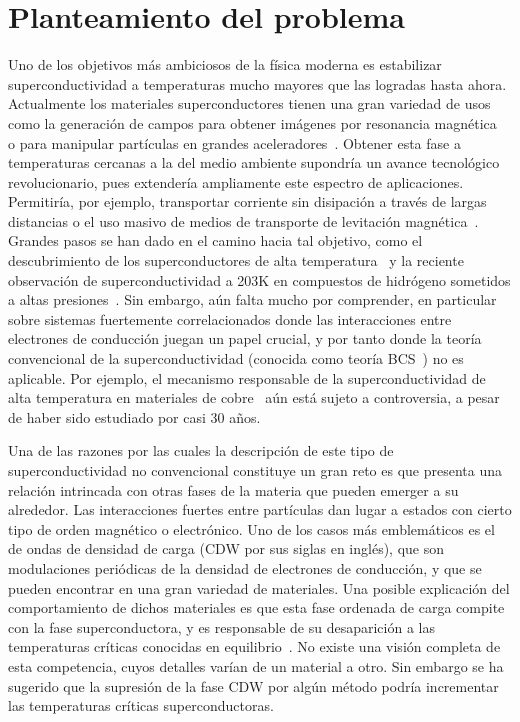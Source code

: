 \documentclass[a4paper,10pt]{article}
\begin{document}
\section{Planteamiento del problema}

Uno de los objetivos m\'as ambiciosos de la f\'isica moderna es estabilizar superconductividad a temperaturas mucho mayores que las logradas hasta ahora. Actualmente los materiales superconductores tienen una gran variedad de usos como la generaci\'on de campos para obtener im\'agenes por resonancia magn\'etica~\cite{aarnink2012euro} o para manipular part\'iculas en grandes aceleradores~\cite{bottura2016ieee}. Obtener esta fase a temperaturas cercanas a la del medio ambiente supondr\'ia un avance tecnol\'ogico revolucionario, pues extender\'ia ampliamente este espectro de aplicaciones. Permitir\'ia, por ejemplo, transportar corriente sin disipaci\'on a trav\'es de largas distancias o el uso masivo de medios de transporte de levitaci\'on magn\'etica~\cite{wang2009ieee}. Grandes pasos se han dado en el camino hacia tal objetivo, como el descubrimiento de los superconductores de alta temperatura~\cite{bednorz_muller} y la reciente observaci\'on de superconductividad a 203K en compuestos de hidr\'ogeno sometidos a altas presiones~\cite{drozdov2015nat}. Sin embargo, a\'un falta mucho por comprender, en particular sobre sistemas fuertemente correlacionados donde las interacciones entre electrones de conducci\'on juegan un papel crucial, y por tanto donde la teor\'ia convencional de la superconductividad (conocida como teor\'ia BCS~\cite{tinkham}) no es aplicable. Por ejemplo, el mecanismo responsable de la superconductividad de alta temperatura en materiales de cobre~\cite{bednorz_muller,keimer2015nat} a\'un est\'a sujeto a controversia, a pesar de haber sido estudiado por casi 30 a\~nos.  

Una de las razones por las cuales la descripci\'on de este tipo de superconductividad no convencional constituye un gran reto es que presenta una relaci\'on intrincada con otras fases de la materia que pueden emerger a su alrededor. Las interacciones fuertes entre part\'iculas dan lugar a estados con cierto tipo de orden magn\'etico o electr\'onico. Uno de los casos m\'as emblem\'aticos es el de ondas de densidad de carga (CDW por sus siglas en ingl\'es), que son modulaciones peri\'odicas de la densidad de electrones de conducci\'on, y que se pueden encontrar en una gran variedad de materiales. Una posible explicaci\'on del comportamiento de dichos materiales es que esta fase ordenada de carga compite con la fase superconductora, y es responsable de su desaparici\'on a las temperaturas cr\'iticas conocidas en equilibrio~\cite{gabovich2010acmp,chang2012nat}. No existe una visi\'on completa de esta competencia, cuyos detalles var\'ian de un material a otro. Sin embargo se ha sugerido que la supresi\'on de la fase CDW por alg\'un m\'etodo podr\'ia incrementar las temperaturas cr\'iticas superconductoras.
\end{document}
